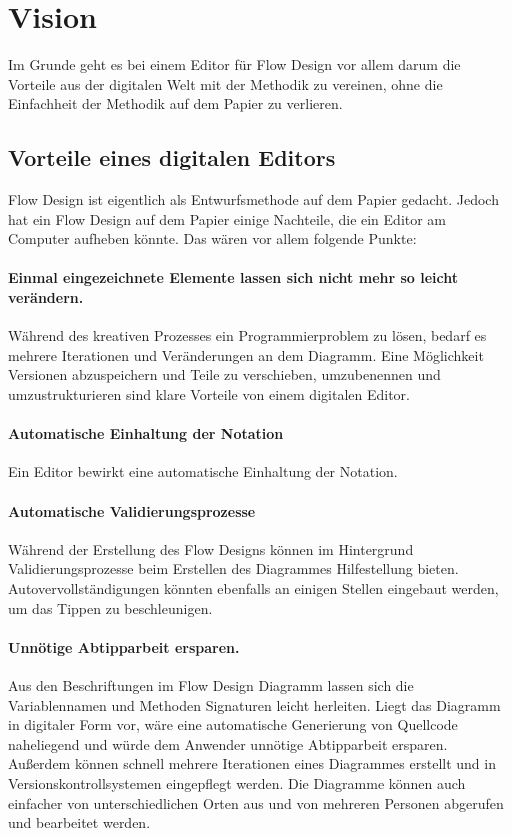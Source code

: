 
\chapter{Vision}

Im Grunde geht es bei einem Editor für Flow Design vor allem darum die Vorteile aus der digitalen Welt mit
der Methodik zu vereinen, ohne die Einfachheit der Methodik auf dem Papier zu
      verlieren.

\section{Vorteile eines digitalen Editors}

Flow Design ist eigentlich als Entwurfsmethode auf dem Papier gedacht.
Jedoch hat ein Flow Design auf dem Papier einige Nachteile, die ein Editor am
Computer aufheben könnte. Das wären vor allem folgende Punkte:
\subsubsection{Einmal eingezeichnete Elemente lassen sich nicht mehr so leicht verändern.}

Während des kreativen Prozesses ein Programmierproblem zu lösen, bedarf es
mehrere Iterationen und Veränderungen an dem Diagramm. Eine Möglichkeit Versionen
abzuspeichern und Teile zu verschieben, umzubenennen und umzustrukturieren sind
klare Vorteile von einem digitalen Editor.
\subsubsection{Automatische Einhaltung der Notation}

Ein Editor bewirkt eine automatische Einhaltung der Notation.
\subsubsection{Automatische Validierungsprozesse}

Während der Erstellung des Flow Designs können im Hintergrund
Validierungsprozesse beim Erstellen des Diagrammes Hilfestellung bieten.
Autovervollständigungen könnten ebenfalls an einigen Stellen eingebaut werden,
um das Tippen zu beschleunigen.
\subsubsection{Unnötige Abtipparbeit ersparen.}

Aus den Beschriftungen im Flow Design Diagramm lassen sich die Variablennamen und
Methoden Signaturen leicht herleiten. Liegt das Diagramm in digitaler Form vor,
wäre eine automatische Generierung von Quellcode naheliegend und
würde dem Anwender unnötige Abtipparbeit ersparen. Außerdem können schnell
mehrere Iterationen eines Diagrammes erstellt und in
Versionskontrollsystemen eingepflegt werden.
Die Diagramme können auch einfacher von unterschiedlichen Orten aus und von mehreren
Personen abgerufen und bearbeitet werden.

